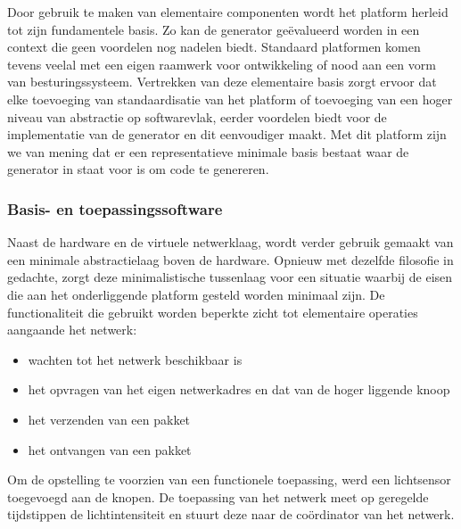 Door gebruik te maken van elementaire componenten wordt het platform herleid
tot zijn fundamentele basis. Zo kan de generator ge\"evalueerd worden in een
context die geen voordelen nog nadelen biedt. Standaard platformen komen tevens
veelal met een eigen raamwerk voor ontwikkeling of nood aan een vorm van
besturingssysteem. Vertrekken van deze elementaire basis zorgt ervoor dat elke
toevoeging van standaardisatie van het platform of toevoeging van een hoger
niveau van abstractie op softwarevlak, eerder voordelen biedt voor de
implementatie van de generator en dit eenvoudiger maakt. Met dit platform zijn
we van mening dat er een representatieve minimale basis bestaat waar de
generator in staat voor is om code te genereren.

\vspace{-3mm}

\subsubsection{Basis- en toepassingssoftware}
\label{subsection:eval-software}

Naast de hardware en de virtuele netwerklaag, wordt verder gebruik gemaakt van
een minimale abstractielaag boven de hardware. Opnieuw met dezelfde filosofie
in gedachte, zorgt deze minimalistische tussenlaag voor een situatie waarbij de
eisen die aan het onderliggende platform gesteld worden minimaal zijn. De
functionaliteit die gebruikt worden beperkte zicht tot elementaire operaties
aangaande het netwerk:

\begin{itemize}[noitemsep, topsep=0pt, partopsep=0pt]

  \item wachten tot het netwerk beschikbaar is

  \item het opvragen van het eigen netwerkadres en dat van de hoger liggende
  knoop

  \item het verzenden van een pakket
  
  \item het ontvangen van een pakket

\end{itemize}

Om de opstelling te voorzien van een functionele toepassing, werd een
lichtsensor toegevoegd aan de knopen. De toepassing van het netwerk meet op
geregelde tijdstippen de lichtintensiteit en stuurt deze naar de co\"ordinator
van het netwerk.

